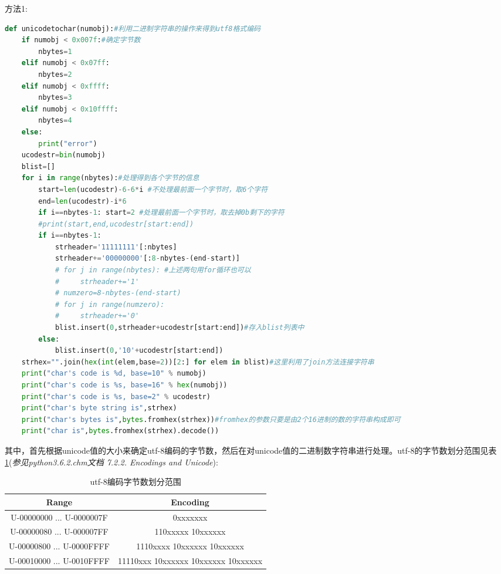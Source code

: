 \documentclass[twoside,11pt]{book}
\begin{document}
方法1:
\begin{lstlisting}[language=python]
def unicodetochar(numobj):#利用二进制字符串的操作来得到utf8格式编码
    if numobj < 0x007f:#确定字节数
        nbytes=1
    elif numobj < 0x07ff:
        nbytes=2
    elif numobj < 0xffff:
        nbytes=3
    elif numobj < 0x10ffff:
        nbytes=4
    else:
        print("error")
    ucodestr=bin(numobj)
    blist=[]
    for i in range(nbytes):#处理得到各个字节的信息
        start=len(ucodestr)-6-6*i #不处理最前面一个字节时，取6个字符
        end=len(ucodestr)-i*6
        if i==nbytes-1: start=2 #处理最前面一个字节时，取去掉0b剩下的字符
        #print(start,end,ucodestr[start:end])
        if i==nbytes-1:
            strheader='11111111'[:nbytes]
            strheader+='00000000'[:8-nbytes-(end-start)]
            # for j in range(nbytes): #上述两句用for循环也可以
            #     strheader+='1'
            # numzero=8-nbytes-(end-start)
            # for j in range(numzero):
            #     strheader+='0'
            blist.insert(0,strheader+ucodestr[start:end])#存入blist列表中
        else:
            blist.insert(0,'10'+ucodestr[start:end])
    strhex="".join(hex(int(elem,base=2))[2:] for elem in blist)#这里利用了join方法连接字符串
    print("char's code is %d, base=10" % numobj)
    print("char's code is %s, base=16" % hex(numobj))
    print("char's code is %s, base=2" % ucodestr)
    print("char's byte string is",strhex)
    print("char's bytes is",bytes.fromhex(strhex))#fromhex的参数只要是由2个16进制的数的字符串构成即可
    print("char is",bytes.fromhex(strhex).decode())
\end{lstlisting}

其中，首先根据unicode值的大小来确定utf-8编码的字节数，然后在对unicode值的二进制数字符串进行处理。utf-8的字节数划分范围见表\ref{tab:utf-8:bytes}(\emph{参见python3.6.2.chm文档 7.2.2. Encodings and Unicode}):
\begin{table}[!htb]
  \centering
  \caption{utf-8编码字节数划分范围}\label{tab:utf-8:bytes}
  \begin{tabular}{|c|c|}
    \hline
    Range & Encoding \\\hline
    U-00000000 ... U-0000007F & 0xxxxxxx \\
    U-00000080 ... U-000007FF & 110xxxxx 10xxxxxx \\
    U-00000800 ... U-0000FFFF & 1110xxxx 10xxxxxx 10xxxxxx \\
    U-00010000 ... U-0010FFFF & 11110xxx 10xxxxxx 10xxxxxx 10xxxxxx \\
    \hline
  \end{tabular}
\end{table}
\end{document}
